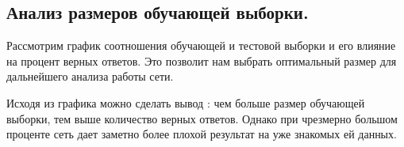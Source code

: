 \subsection{Анализ размеров обучающей выборки.}
Рассмотрим график соотношения обучающей и тестовой выборки и его влияние на процент верных ответов. Это позволит нам выбрать оптимальный  размер для дальнейшего анализа работы сети.
\begin{figure}[H]
\end{figure}
Исходя из графика можно сделать вывод : чем больше размер обучающей выборки, тем выше количество верных ответов. Однако при чрезмерно большом проценте сеть дает заметно более плохой результат на уже знакомых ей данных. 

